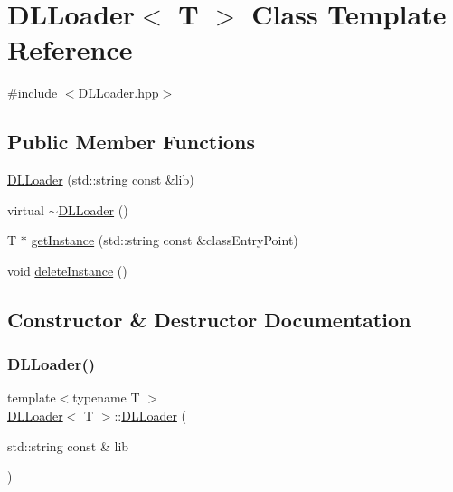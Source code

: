 \hypertarget{class_d_l_loader}{}\section{D\+L\+Loader$<$ T $>$ Class Template Reference}
\label{class_d_l_loader}


{\ttfamily \#include $<$D\+L\+Loader.\+hpp$>$}

\subsection*{Public Member Functions}
\begin{DoxyCompactItemize}
\item 
\hyperlink{class_d_l_loader_a07bb2898993398632561704ffc3e4fc2}{D\+L\+Loader} (std\+::string const \&lib)
\item 
virtual \hyperlink{class_d_l_loader_aea867b497cf92c50f85ad7e1d37962ae}{$\sim$\+D\+L\+Loader} ()
\item 
T $\ast$ \hyperlink{class_d_l_loader_a27e0859099bf3bc981ee615078bc1c2f}{get\+Instance} (std\+::string const \&class\+Entry\+Point)
\item 
void \hyperlink{class_d_l_loader_acdd8ffa8f550ca1abe29bc1b24dc9914}{delete\+Instance} ()
\end{DoxyCompactItemize}


\subsection{Constructor \& Destructor Documentation}
\mbox{\label{class_d_l_loader_a07bb2898993398632561704ffc3e4fc2}} 
\subsubsection{\texorpdfstring{D\+L\+Loader()}{DLLoader()}}
{\footnotesize\ttfamily template$<$typename T $>$ \\
\hyperlink{class_d_l_loader}{D\+L\+Loader}$<$ T $>$\+::\hyperlink{class_d_l_loader}{D\+L\+Loader} (\begin{DoxyParamCaption}\item[{std\+::string const \&}]{lib }\end{DoxyParamCaption})}

\mbox{\label{class_d_l_loader_aea867b497cf92c50f85ad7e1d37962ae}} 
